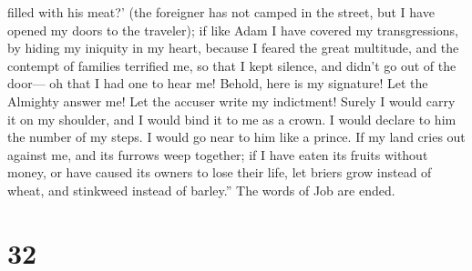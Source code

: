 filled with his meat?'  (the foreigner has not camped in
the street, but I have opened my doors to the traveler); 
if like Adam I have covered my transgressions, by hiding my iniquity in
my heart,  because I feared the great multitude, and the
contempt of families terrified me, so that I kept silence, and didn't go
out of the door---  oh that I had one to hear me! Behold,
here is my signature! Let the Almighty answer me! Let the accuser write
my indictment!  Surely I would carry it on my shoulder, and
I would bind it to me as a crown.  I would declare to him
the number of my steps. I would go near to him like a prince.
 If my land cries out against me, and its furrows weep
together;  if I have eaten its fruits without money, or
have caused its owners to lose their life,  let briers grow
instead of wheat, and stinkweed instead of barley.'' The words of Job
are ended.

\hypertarget{section-17}{%
\section{32}\label{section-17}}

